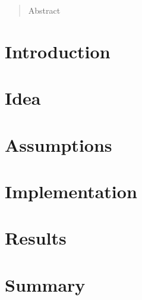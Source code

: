 \documentclass[12pt, twoside, a4paper, openright]{report}
\begin{document}


\cleardoublepage

 
\cleardoublepage



\cleardoublepage


\begin{abstract}
    Abstract
\end{abstract}

\tableofcontents

\newpage
{}

\chapter{Introduction}


\chapter{Idea} \label{ch:idea}


\chapter{Assumptions}


\chapter{Implementation}


\chapter{Results}


\chapter{Summary} \label{ch:summary}


\nocite{*}


\end{document}
